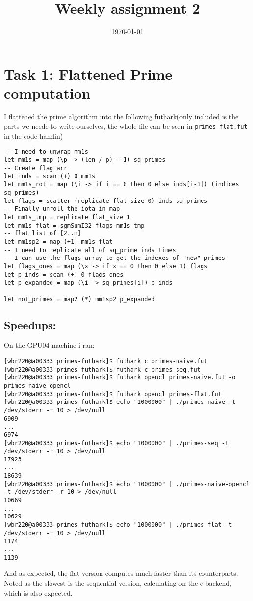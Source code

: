 \documentclass[11pt]{article}
\date{\today}
\title{Weekly assignment 2}
\begin{document}
\maketitle
\tableofcontents

\section{Task 1: Flattened Prime computation}
\label{sec:orgcd0d119}
I flattened the prime algorithm into the following futhark(only included
is the parts we neede to write ourselves, the whole file can be seen in
\texttt{primes-flat.fut} in the code handin) 
\begin{verbatim}
-- I need to unwrap mm1s
let mm1s = map (\p -> (len / p) - 1) sq_primes 
-- Create flag arr
let inds = scan (+) 0 mm1s
let mm1s_rot = map (\i -> if i == 0 then 0 else inds[i-1]) (indices sq_primes)
let flags = scatter (replicate flat_size 0) inds sq_primes
-- Finally unroll the iota in map
let mm1s_tmp = replicate flat_size 1
let mm1s_flat = sgmSumI32 flags mm1s_tmp
-- flat list of [2..m]
let mm1sp2 = map (+1) mm1s_flat
-- I need to replicate all of sq_prime inds times
-- I can use the flags array to get the indexes of "new" primes
let flags_ones = map (\x -> if x == 0 then 0 else 1) flags
let p_inds = scan (+) 0 flags_ones
let p_expanded = map (\i -> sq_primes[i]) p_inds

let not_primes = map2 (*) mm1sp2 p_expanded

\end{verbatim}

\subsection{Speedups:}
\label{sec:org5b828b3}
On the GPU04 machine i ran:
\begin{verbatim}
[wbr220@a00333 primes-futhark]$ futhark c primes-naive.fut
[wbr220@a00333 primes-futhark]$ futhark c primes-seq.fut
[wbr220@a00333 primes-futhark]$ futhark opencl primes-naive.fut -o primes-naive-opencl
[wbr220@a00333 primes-futhark]$ futhark opencl primes-flat.fut
[wbr220@a00333 primes-futhark]$ echo "1000000" | ./primes-naive -t /dev/stderr -r 10 > /dev/null
6909
...
6974
[wbr220@a00333 primes-futhark]$ echo "1000000" | ./primes-seq -t /dev/stderr -r 10 > /dev/null
17923
...
18639
[wbr220@a00333 primes-futhark]$ echo "1000000" | ./primes-naive-opencl -t /dev/stderr -r 10 > /dev/null
10669
...
10629
[wbr220@a00333 primes-futhark]$ echo "1000000" | ./primes-flat -t /dev/stderr -r 10 > /dev/null
1174
...
1139
\end{verbatim}
And as expected, the flat version computes much faster than its counterparts.
Noted as the slowest is the sequential version, calculating on the c backend,
which is also expected.
\end{document}
